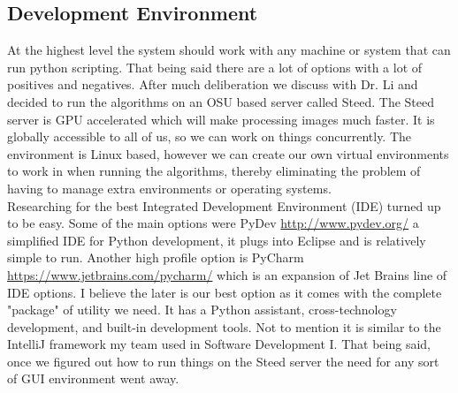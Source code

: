 \documentclass[10pt,draftclsnofoot,onecolumn,journal,compsoc]{IEEEtran}
\begin{document}
	\subsection{Development Environment}
	At the highest level the system should work with any machine or system that can run python scripting. That being said there are a lot of options with a lot of positives and negatives. After much deliberation we discuss with Dr. Li and decided to run the algorithms on an OSU based server called Steed. The Steed server is GPU accelerated which will make processing images much faster. It is globally accessible to all of us, so we can work on things concurrently. The environment is Linux based, however we can create our own virtual environments to work in when running the algorithms, thereby eliminating the problem of having to manage extra environments or operating systems.\\
	Researching for the best Integrated Development Environment (IDE) turned up to be easy. Some of the main options were PyDev \url{http://www.pydev.org/} a simplified IDE for Python development, it plugs into Eclipse and is relatively simple to run. Another high profile option is PyCharm \url{https://www.jetbrains.com/pycharm/} which is an expansion of Jet Brains line of IDE options. I believe the later is our best option as it comes with the complete "package" of utility we need. It has a Python assistant, cross-technology development, and built-in development tools. Not to mention it is similar to the IntelliJ framework my team used in Software Development I. That being said, once we figured out how to run things on the Steed server the need for any sort of GUI environment went away. 
	
	
	
	
	
	
	
\end{document}
